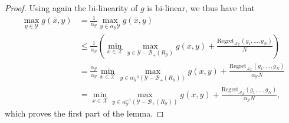 \documentclass[a4paper,12pt]{article}
\newcommand{\mY}{\mathcal{Y}}
\newcommand{\mX}{\mathcal{X}}
\newcommand{\tY}{\tilde{\mathcal{Y}}}
\newcommand{\mB}{\mathcal{B}}
\begin{document}
\begin{proof}
Using again the bi-linearity of $g$ is bi-linear, we thus have that
\begin{align*}
\max_{y \in \mY}g(\bar{x},y) &= \frac{1}{\alpha_{\mY}}\max_{y \in \alpha_{\mY} \mY}g(\bar{x},y)\\ 
&\leq  \frac{1}{\alpha_{\mY}}\left(\min_{x\in \mX} \max_{y \in \mY-\mB_+(R_{\mY}) } g(x,y)+ \frac{\text{Regret}_{\mathcal{A}_\mX}(g_1,\dots,g_N)}{N}\right) \\
 &=\frac{\alpha_{\mY}}{\alpha_{\mY}}\min_{x\in \mX} \max_{y \in \alpha_{\mY}^{-1}(\mY-\mB_+(R_{\mY})) } g(x,y)+\frac{\text{Regret}_{\mathcal{A}_\mX}(g_1,\dots,g_N)}{\alpha_{\mY} N} \\
&=\min_{x\in \mX} \max_{y \in \alpha_{\mY}^{-1}(\mY-\mB_+(R_{\mY})) } g(x,y)+ \frac{\text{Regret}_{\mathcal{A}_\mX}(g_1,\dots,g_N)}{\alpha_{\mY} N},
\end{align*}
which proves the first part of the lemma.


\end{proof}
\end{document}
